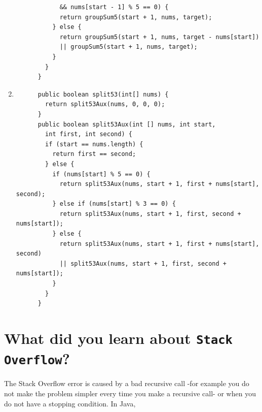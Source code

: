 \documentclass[a4paper,12pt]{article}
\begin{document}
\begin{enumerate}
\begin{Verbatim}
            && nums[start - 1] % 5 == 0) {
            return groupSum5(start + 1, nums, target);
          } else {
            return groupSum5(start + 1, nums, target - nums[start])
            || groupSum5(start + 1, nums, target);
          }
        }
      }
      \end{Verbatim}
      \item \begin{Verbatim}
      public boolean split53(int[] nums) {
        return split53Aux(nums, 0, 0, 0);
      }
      public boolean split53Aux(int [] nums, int start,
        int first, int second) {
        if (start == nums.length) {
          return first == second;
        } else {
          if (nums[start] % 5 == 0) {
            return split53Aux(nums, start + 1, first + nums[start], second);
          } else if (nums[start] % 3 == 0) {
            return split53Aux(nums, start + 1, first, second + nums[start]);
          } else {
            return split53Aux(nums, start + 1, first + nums[start], second)
            || split53Aux(nums, start + 1, first, second + nums[start]);
          }
        }
      }
      \end{Verbatim}
    \end{enumerate}
    \section{What did you learn about \texttt{Stack Overflow}?}
      The Stack Overflow error is caused by a bad recursive call -for example you do not make
      the problem simpler every time you make a recursive call- or when you do not have a stopping
      condition. In Java,
\end{document}
